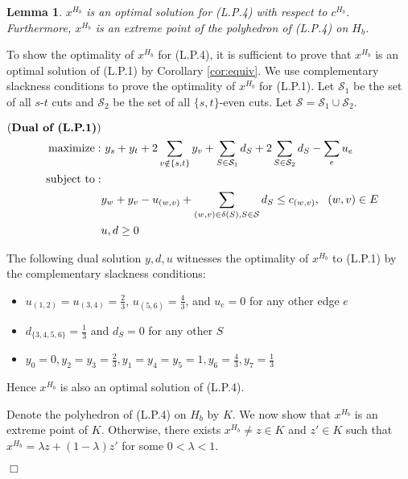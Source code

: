 \documentclass[11pt]{article}
\newcommand{\qed}{\hspace*{\fill}$\Box$}
\newtheorem{lemma}[theorem]{Lemma}
\newenvironment{proof}[1][Proof. ]{\noindent {\bf #1 }}{\qed}
\begin{document}
\begin{lemma}\label{lem:feaExtreme}
$x^{H_b}$ is an optimal solution for (L.P.4) with respect to $c^{H_b}$.
Furthermore, $x^{H_b}$ is an extreme point of the polyhedron of (L.P.4) on $H_b$.
\end{lemma}
\begin{proof}
To show the optimality of $x^{H_b}$ for (L.P.4), it is sufficient to prove that $x^{H_b}$ is an optimal
solution of (L.P.1) by Corollary \ref{cor:equiv}. We use complementary slackness conditions to prove the optimality of $x^{H_b}$ for (L.P.1).
Let $\mathcal{S}_1$ be the set of all $s$-$t$ cuts and $\mathcal{S}_2$ be the set of all $\{s,t\}$-even cuts. Let $\mathcal{S}=\mathcal{S}_1\cup \mathcal{S}_2$.

$
     \begin{aligned}
     \hbox{({\bf Dual of (L.P.1)})}  \\
     {\rm maximize}: &\ y_s+y_t+2\sum_{v\notin\{s, t\}}y_v +\sum_{S\in \mathcal{S}_1}d_{S}+2\sum_{S\in \mathcal{S}_2}d_{S}-\sum_{e}u_e & \\
{\rm subject~to}:  \\
&y_w+y_v-u_{(w,v)}+\sum_{(w, v)\in \delta(S), S\in \mathcal{S}} d_{S} \leq c_{(w, v)},\ \ (w, v)\in E& \\
&u, d \geq 0  &
     \end{aligned}
$

The following dual solution $y, d, u$ witnesses the optimality of $x^{H_b}$ to (L.P.1) by the complementary slackness conditions:
\begin{itemize}
\item $u_{(1, 2)}=u_{(3, 4)}=\frac{2}{3}$, $u_{(5, 6)}=\frac{4}{3}$, and $u_{e}=0$ for any other edge $e$
\item $d_{\{3, 4, 5, 6\}}=\frac{1}{3}$ and $d_{S}=0$ for any other $S$
\item $y_{0}=0, y_2=y_3=\frac{2}{3}, y_1=y_4=y_5=1, y_6=\frac{4}{3}, y_7=\frac{1}{3}$
\end{itemize}
Hence $x^{H_b}$ is also an optimal solution of (L.P.4).

Denote the polyhedron of (L.P.4) on $H_b$ by $K$. We now show that $x^{H_b}$ is an extreme point of $K$. Otherwise,
there exists $x^{H_b}\neq z\in K$ and $z'\in K$ such that $x^{H_b}=\lambda z +(1-\lambda)z'$ for some
$0<\lambda <1$.


\end{proof}
\end{document}
